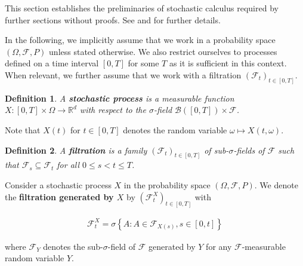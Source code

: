 \documentclass[a4paper]{article}
\newtheorem{definition}{Definition}[section]
\begin{document}

This section establishes the preliminaries of stochastic calculus required by further sections without proofs. See \textcite{capinski_stochastic_2012} and \textcite{capinski_blackscholes_2012} for further details.

In the following, we implicitly assume that we work in a probability space $(\Omega, \mathcal{F}, P)$ unless stated otherwise. We also restrict ourselves to processes defined on a time interval $[0,T]$ for some $T$ as it is sufficient in this context. When relevant, we further assume that we work with a filtration $(\mathcal{F}_t)_{t \in [0,T]}$.

\begin{definition}
  A \textbf{stochastic process} is a measurable function $X : [0,T] \times \Omega \to \mathbb{R}^d$ with respect to the $\sigma$-field $\mathcal{B}([0,T]) \times \mathcal{F}$.
\end{definition}

Note that $X(t)$ for $t \in [0,T]$ denotes the random variable $\omega \mapsto X(t,\omega)$.

\begin{definition}
  A \textbf{filtration} is a family $(\mathcal{F}_t)_{t \in [0,T]}$ of sub-$\sigma$-fields of $\mathcal{F}$ such that $\mathcal{F}_s \subseteq \mathcal{F}_t$ for all $0 \le s < t \le T$.
\end{definition}

Consider a stochastic process $X$ in the probability space $(\Omega, \mathcal{F}, P)$. We denote the \textbf{filtration generated by $X$} by $(\mathcal{F}^X_t)_{t \in [0,T]}$ with

\begin{align*}
  \mathcal{F}^X_t = \sigma \left\{ A : A \in \mathcal{F}_{X(s)}, s \in [0,t] \right\}
\end{align*}

where $\mathcal{F}_{Y}$ denotes the sub-$\sigma$-field of $\mathcal{F}$ generated by $Y$ for any $\mathcal{F}$-measurable random variable $Y$.
\end{document}
